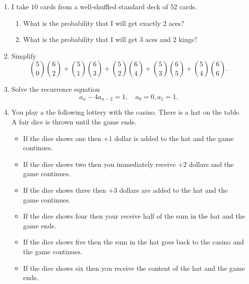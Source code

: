 \documentclass[12pt]{article}
\begin{document}






\begin{enumerate}

    \item I take $10$ cards from a well-shuffled standard deck of $52$ cards. 
    
    \begin{enumerate}
        \item What is the probability that I will get exactly $2$ aces?
        \item What is the probability that I will get $3$ aces and $2$ kings?
    \end{enumerate}

    \item Simplify 
    \[
    {5 \choose 0}{6 \choose 2} + {5 \choose 1}{6 \choose 3} + {5 \choose 2}{6 \choose 4} + {5 \choose 3}{6 \choose 5} + {5 \choose 4}{6 \choose 6}.
    \]


    \item Solve the recurrence equation 
    \[
        a_n - 4a_{n-2} = 1, \quad a_0 = 0, a_1 = 1.
    \]

    \item You play a the following lottery with the casino. There is a hat on the table. 
A fair dice is thrown until the game ends. 
\begin{itemize}
    \item If the dice shows one then $+1$ dollar is added to the hat and the game continues. 
    \item If the dice shows two then you immediately receive $+2$ dollars and the game continues. 
    \item If the dice shows three then $+3$ dollars are added to the hat and the game continues.
    \item If the dice shows four then your receive half of the sum in the hat and the game ends.
    \item If the dice shows five then the sum in the hat goes back to the casino and the game continues.
    \item If the dice shows six then you receive the content of the hat and the game ends.
\end{itemize}


\end{enumerate}
\end{document}
